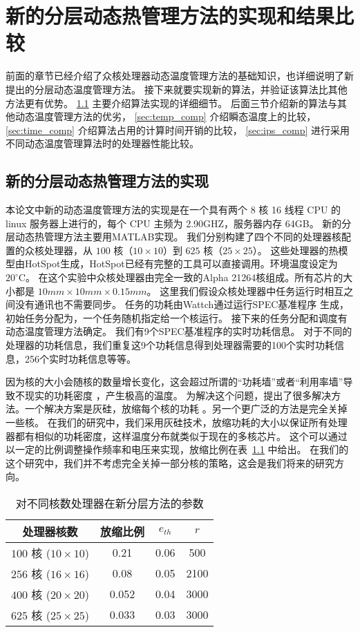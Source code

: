 
\chapter{新的分层动态热管理方法的实现和结果比较}\label{sec:exp}

前面的章节已经介绍了众核处理器动态温度管理方法的基础知识，也详细说明了新提出的分层动态温度管理方法。
接下来就要实现新的算法，并验证该算法比其他方法更有优势。
 \ref{sec:method_implement} 主要介绍算法实现的详细细节。 后面三节介绍新的算法与其他动态温度管理方法的优劣， \ref{sec:temp_comp} 介绍瞬态温度上的比较， \ref{sec:time_comp} 介绍算法占用的计算时间开销的比较，
 \ref{sec:ips_comp} 进行采用不同动态温度管理算法时的处理器性能比较。
\section{新的分层动态热管理方法的实现}\label{sec:method_implement}
本论文中新的动态温度管理方法的实现是在一个具有两个 8 核 16 线程 CPU 的 linux 服务器上进行的，每个 CPU 主频为 2.90GHZ，服务器内存 64GB。
新的分层动态热管理方法主要用MATLAB实现。
我们分别构建了四个不同的处理器核配置的众核处理器，从 $100$ 核（$10 \times 10$）到 $625$ 核（$25 \times 25$）。
这些处理器的热模型由HotSpot生成，HotSpot已经有完整的工具可以直接调用。环境温度设定为 $20^{\circ}$C。
在这个实验中众核处理器由完全一致的Alpha 21264核组成。所有芯片的大小都是 $10mm \times 10mm \times 0.15mm$。
这里我们假设众核处理器中任务运行时相互之间没有通讯也不需要同步。
任务的功耗由Wattch通过运行SPEC基准程序  \cite{Henning:IEEEC'00} 生成，初始任务分配为，一个任务随机指定给一个核运行。
接下来的任务分配和调度有动态温度管理方法确定。
我们有9个SPEC基准程序的实时功耗信息。
对于不同的处理器的功耗信息，我们重复这9个功耗信息得到处理器需要的100个实时功耗信息，256个实时功耗信息等等。

因为核的大小会随核的数量增长变化，这会超过所谓的“功耗墙”或者“利用率墙”导致不现实的功耗密度  \cite{Taylor:MICRO'13} ，产生极高的温度。
为解决这个问题，提出了很多解决方法。一个解决方案是灰硅，放缩每个核的功耗  \cite{Huang:MICRO'11,Taylor:MICRO'13}。另一个更广泛的方法是完全关掉一些核\cite{Taylor:MICRO'13,Shafique:DAC'14}。
在我们的研究中，我们采用灰硅技术，放缩功耗的大小以保证所有处理器都有相似的功耗密度，这样温度分布就类似于现在的多核芯片。
这个可以通过以一定的比例调整操作频率和电压来实现，放缩比例在表~\ref{tab:param} 中给出。
在我们的这个研究中，我们并不考虑完全关掉一部分核的策略，这会是我们将来的研究方向。
\begin{table}[H]
\centering
\caption{对不同核数处理器在新分层方法的参数}\label{tab:param}{
 \begin{tabular}{|c|c|c|c|}
 \hline
 \hline
 处理器核数 &  放缩比例 & $e_{th}$ & $r$ \\
 \hline 
 \hline
 $100$ 核 ($10 \times 10$) & 0.21 & 0.06 & 500  \\
 \hline
 $256$ 核 ($16 \times 16$) & 0.08 & 0.05 & 2100 \\
 \hline
 $400$ 核 ($20 \times 20$) & 0.052 & 0.04 & 3000 \\
 \hline
 $625$ 核 ($25 \times 25$) & 0.033 & 0.03 & 3000 \\
 \hline
 \hline
 \end{tabular}
 }
 \end{table}
 
